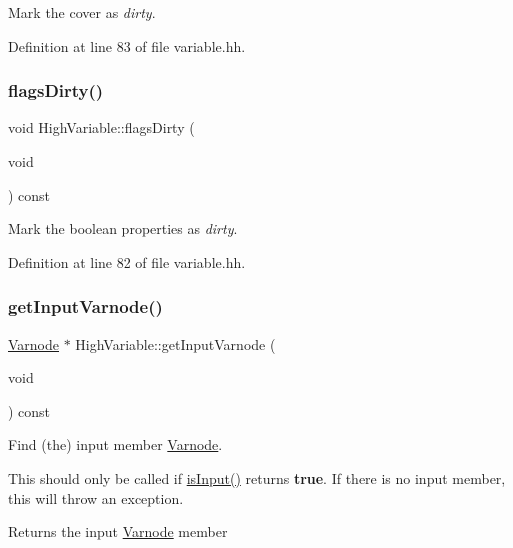 Mark the cover as {\itshape dirty}. 



Definition at line 83 of file variable.\+hh.

\mbox{\label{class_high_variable_a33d4e9529cead1b1cad9377e08eac03c}} 
\subsubsection{\texorpdfstring{flagsDirty()}{flagsDirty()}}
{\footnotesize\ttfamily void High\+Variable\+::flags\+Dirty (\begin{DoxyParamCaption}\item[{void}]{ }\end{DoxyParamCaption}) const\hspace{0.3cm}{\ttfamily [inline]}}



Mark the boolean properties as {\itshape dirty}. 



Definition at line 82 of file variable.\+hh.

\mbox{\label{class_high_variable_a7400ca6092273e5c22e8a2bf3184e698}} 
\subsubsection{\texorpdfstring{getInputVarnode()}{getInputVarnode()}}
{\footnotesize\ttfamily \mbox{\hyperlink{class_varnode}{Varnode}} $\ast$ High\+Variable\+::get\+Input\+Varnode (\begin{DoxyParamCaption}\item[{void}]{ }\end{DoxyParamCaption}) const}



Find (the) input member \mbox{\hyperlink{class_varnode}{Varnode}}. 

This should only be called if \mbox{\hyperlink{class_high_variable_afdf95522df96248264289c1b6b8df2e8}{is\+Input()}} returns {\bfseries{true}}. If there is no input member, this will throw an exception. \begin{DoxyReturn}{Returns}
the input \mbox{\hyperlink{class_varnode}{Varnode}} member 
\end{DoxyReturn}


